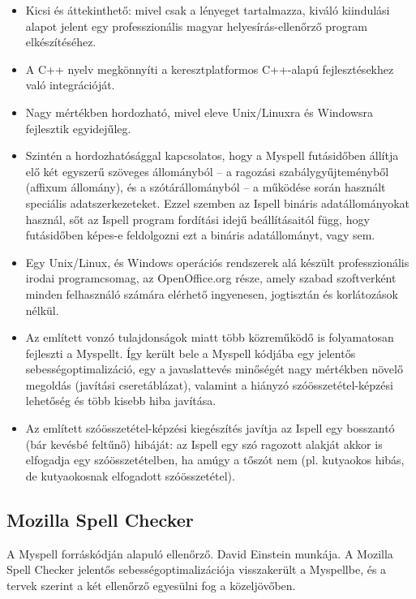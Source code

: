 \begin{itemize}
\item Kicsi és áttekinthető: mivel csak a lényeget
tartalmazza, kiváló kiindulási alapot jelent egy
professzionális magyar helyesírás-ellenőrző
program elkészítéséhez.

\item A C++ nyelv megkönnyíti a keresztplatformos
C++-alapú fejlesztésekhez való integrációját.

\item Nagy mértékben hordozható, mivel
eleve Unix/Linuxra és Windowsra fejlesztik
egyidejűleg.

\item Szintén a hordozhatósággal kapcsolatos,
hogy a Myspell futásidőben állítja elő két egyszerű
szöveges állományból --
a ragozási szabálygyűjteményből (affixum állomány),
és a szótárállományból -- a működése során használt
speciális adatszerkezeteket. Ezzel szemben az Ispell
bináris adatállományokat használ, 
sőt az Ispell program fordítási idejű beállításaitól
függ, hogy futásidőben képes-e feldolgozni ezt
a bináris adatállományt, vagy sem.

\item Egy Unix/Linux, és Windows operációs
rendszerek alá készült professzionális irodai
programcsomag, az OpenOffice.org része, amely
szabad szoftverként minden felhasználó számára
elérhető ingyenesen, jogtisztán és korlátozások
nélkül.

\item Az említett vonzó tulajdonságok miatt
több közreműködő is folyamatosan fejleszti
a Myspellt. Így került bele a Myspell kódjába
egy jelentős sebességoptimalizáció, egy a javaslattevés
minőségét nagy mértékben növelő megoldás (javítási
cseretáblázat), valamint a hiányzó szóösszetétel-képzési lehetőség
és több kisebb hiba javítása.

\item Az említett szóösszetétel-képzési kiegészítés
javítja az Ispell egy bosszantó (bár kevésbé feltűnő) hibáját:
az Ispell egy szó ragozott alakját akkor is elfogadja
egy szóösszetételben, ha amúgy a tőszót nem
(pl. kutyaokos hibás, de kutyaokosnak elfogadott szóösszetétel).
\end{itemize}

\subsection{Mozilla Spell Checker}

A Myspell forráskódján alapuló ellenőrző.
David Einstein munkája. A Mozilla Spell Checker
jelentős sebességoptimalizációja visszakerült
a Myspellbe, és a tervek szerint a két
ellenőrző egyesülni fog a közeljövőben.

